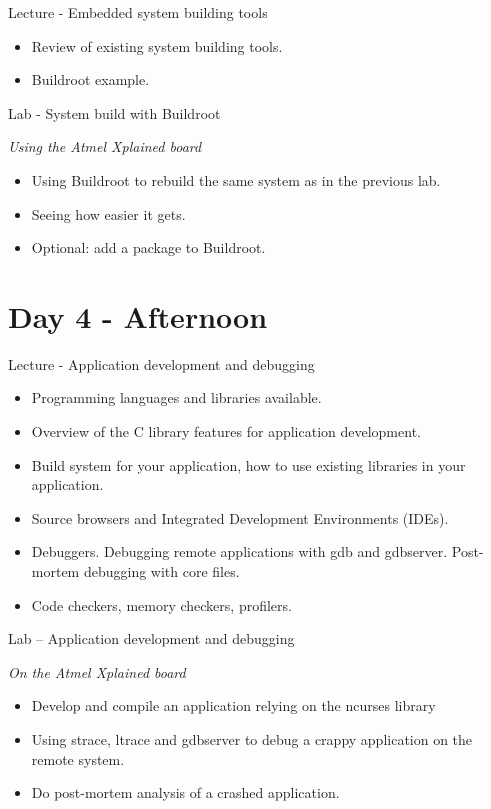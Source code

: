 \documentclass[a4paper,12pt,obeyspaces,spaces,hyphens]{article}
\begin{document}
\feagendatwocolumn
{Lecture - Embedded system building tools}
{
  \begin{itemize}
  \item Review of existing system building tools.
  \item Buildroot example.
  \end{itemize}
}
{Lab - System build with Buildroot}
{
  {\em Using the Atmel Xplained board}
  \begin{itemize}
  \item Using Buildroot to rebuild the same system as in the previous lab.
  \item Seeing how easier it gets.
  \item Optional: add a package to Buildroot.
  \end{itemize}
}

\section{Day 4 - Afternoon}

\feagendaonecolumn
{Lecture - Application development and debugging}
{
  \begin{itemize}
  \item Programming languages and libraries available.
  \item Overview of the C library features for application development.
  \item Build system for your application,
        how to use existing libraries in your application.
  \item Source browsers and Integrated Development Environments (IDEs).
  \item Debuggers. Debugging remote applications with gdb and gdbserver.
        Post-mortem debugging with core files.
  \item Code checkers, memory checkers, profilers.
  \end{itemize}
}

\feagendaonecolumn
{Lab – Application development and debugging}
{
  {\em On the Atmel Xplained board}
  \begin{itemize}
  \item Develop and compile an application relying on the ncurses library
  \item Using strace, ltrace and gdbserver to debug a crappy application
        on the remote system.
  \item Do post-mortem analysis of a crashed application.
  \end{itemize}
}
\end{document}
